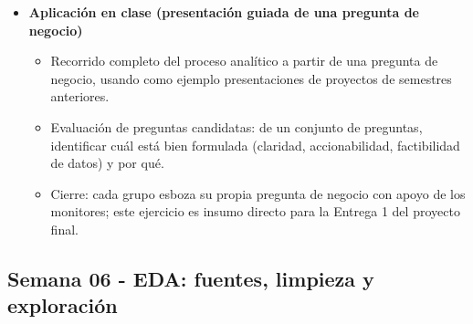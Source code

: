 \documentclass{article}
\begin{document}
\begin{itemize}
\item \textbf{Aplicación en clase (presentación guiada de una pregunta de negocio)}
\begin{itemize}
  \item Recorrido completo del proceso analítico a partir de una pregunta de negocio, usando como ejemplo presentaciones de proyectos de semestres anteriores.
  \item Evaluación de preguntas candidatas: de un conjunto de preguntas, identificar cuál está bien formulada (claridad, accionabilidad, factibilidad de datos) y por qué.
  \item Cierre: cada grupo esboza su propia pregunta de negocio con apoyo de los monitores; este ejercicio es insumo directo para la Entrega 1 del proyecto final.
\end{itemize}
\end{itemize}

\newpage
\subsection{Semana 06 - EDA: fuentes, limpieza y exploración}
\vspace{0.2 cm}
\end{document}
